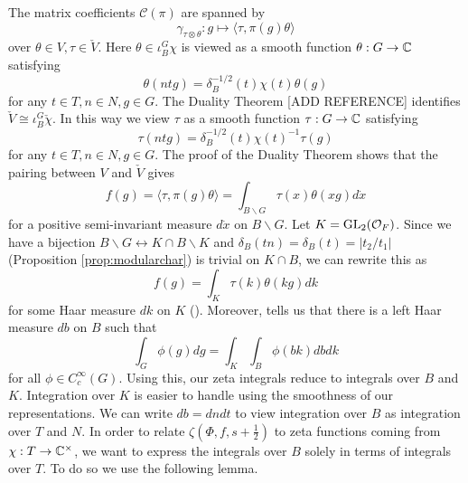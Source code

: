 The matrix coefficients $\mathcal C(\pi)$ are spanned by 
$$\gamma_{\tau \otimes \theta} : g \mapsto \langle \tau, \pi(g) \theta \rangle$$ over $\theta \in V, \tau \in \check{V}$. Here $\theta \in \iota_B^G \chi$ is viewed as a smooth function $\theta : G \to \mathbb{C}$ satisfying 
$$\theta(ntg) = \delta_B^{-1/2}(t) \chi(t) \theta(g)$$
for any $t \in T, n \in N, g \in G$. The Duality Theorem [ADD REFERENCE] identifies $\check{V} \cong \iota_B^G \check{\chi}$. In this way we view $\tau$ as a smooth function $\tau: G \to \mathbb{C}$ satisfying
$$\tau(ntg) = \delta_B^{-1/2}(t)\chi(t)^{-1}\tau(g)$$
for any $t \in T, n \in N, g \in G$. The proof of the Duality Theorem shows that the pairing between $V$ and $\check{V}$ gives
$$f(g) = \langle \tau, \pi(g)\theta \rangle = \int_{B\backslash G} \tau(x)\theta(xg) d\dot{x}$$ for a positive semi-invariant measure $d\dot{x}$ on $B \backslash G$. Let $K=\mathrm{GL}_2(\mathcal{O}_F)$. Since we have a bijection $B \backslash G \leftrightarrow K \cap B \backslash K$ and $\delta_B(tn)=\delta_B(t) = |t_2/t_1|$ (Proposition \ref{prop:modularchar}) is trivial on $K\cap B$, we can rewrite this as 
$$f(g) = \int_K \tau(k)\theta(kg)dk$$ for some Haar measure $dk$ on $K$ (\cite[Corollary 7.6]{BH1}). Moreover, \cite[Equation 7.6.2]{BH1} tells us that there is a left Haar measure $db$ on $B$ such that
$$\int_G \phi(g) dg = \int_K \int_B \phi(bk) dbdk$$ for all $\phi \in C_c^\infty(G)$. Using this, our zeta integrals reduce to integrals over $B$ and $K$. Integration over $K$ is easier to handle using the smoothness of our representations. We can write $db = dn dt$ to view integration over $B$ as integration over $T$ and $N$. In order to relate $\zeta(\Phi,f,s+\frac{1}{2})$ to zeta functions coming from $\chi: T \to \mathbb{C}^\times$, we want to express the integrals over $B$ solely in terms of integrals over $T$. To do so we use the following lemma. 


